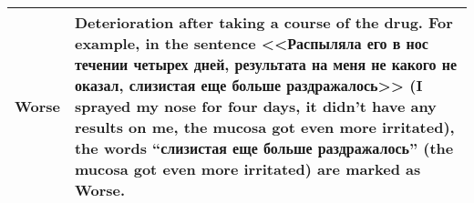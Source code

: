 \begin{tabular}{|p{}|p{}|}
Worse       & Deterioration after taking a course of the drug. For example, in the sentence <<Распыляла его в нос течении четырех дней, результата на меня не какого не оказал, слизистая еще больше раздражалось>> (I sprayed my nose for four days, it didn't have any results on me, the mucosa got even more irritated), the words ``слизистая еще больше раздражалось'' (the mucosa got even more irritated) are marked as Worse.
\\ \hline
\end{tabular}